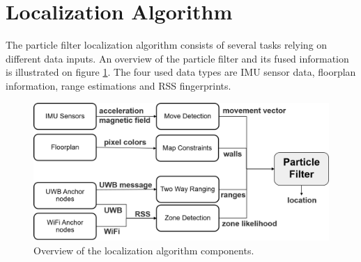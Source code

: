 \section{Localization Algorithm}
The particle filter localization algorithm consists of several tasks relying on different data inputs. An overview of the particle filter and its fused information is illustrated on figure \ref{fig:localization_algorithm}. The four used data types are IMU sensor data, floorplan information, range estimations and RSS fingerprints.\\
\begin{figure}[th]
\centering
\includegraphics[width=1.0\textwidth]{Figures/localization_algorithm}
\decoRule
\caption[Localization Algorithm]{Overview of the localization algorithm components.}
\label{fig:localization_algorithm}
\end{figure}

